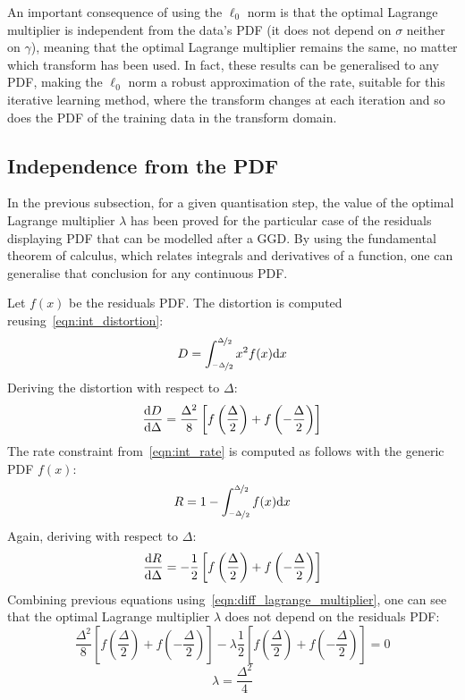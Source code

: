 \documentclass[11pt,a4paper,openright,twoside]{book}
\numberwithin{equation}{section} %
\numberwithin{figure}{section} %
\numberwithin{table}{section} %
\begin{document}
An important consequence of using the $\ell_0$ norm is that the optimal
Lagrange multiplier is independent from the data's \ac{PDF} (it does
not depend on $\sigma$ neither on $\gamma$), meaning that the optimal
Lagrange multiplier remains the same, no matter which transform has been
used.
In fact, these results can be generalised to any \ac{PDF}, making the
$\ell_0$ norm a robust approximation of the rate, suitable for this
iterative learning method, where the transform changes at each iteration
and so does the \ac{PDF} of the training data in the transform domain.

\subsection{Independence from the \acs{PDF}}
\label{sub:independence_from_the_pdf}

In the previous subsection, for a given quantisation step, the value of
the optimal Lagrange multiplier $\lambda$ has been proved for the
particular case of the residuals displaying \ac{PDF} that can be
modelled after a \ac{GGD}.
By using the fundamental theorem of calculus, which relates integrals
and derivatives of a function, one can generalise that conclusion for
any continuous \ac{PDF}.

Let $f(x)$ be the residuals \ac{PDF}.
The distortion is computed reusing~\eqref{eqn:int_distortion}:
\begin{equation}
	D = \int_{\nicefrac{-\Delta}{2}}^{\nicefrac{\Delta}{2}} x^2 f(x) \text{d} x
\end{equation}
Deriving the distortion with respect to $\Delta$:
\begin{equation}
	\frac{\text{d} D}{\text{d} \Delta} =
	\frac{\Delta^2}{8}\left[
	f\left(\frac{\Delta}{2}\right)+f\left(-\frac{\Delta}{2}\right)\right]
\end{equation}
The rate constraint from~\eqref{eqn:int_rate} is computed as
follows with the generic \ac{PDF}
$f(x)$:
\begin{equation}
	R = 1 - \int_{\nicefrac{-\Delta}{2}}^{\nicefrac{\Delta}{2}} f(x) \text{d} x\\
\end{equation}
Again, deriving with respect to $\Delta$:
\begin{equation}
	\frac{\text{d} R}{\text{d} \Delta} =
	-\frac{1}{2}\left[
	f\left(\frac{\Delta}{2}\right)+
	f\left(-\frac{\Delta}{2}\right)\right]
\end{equation}
Combining previous equations using~\eqref{eqn:diff_lagrange_multiplier},
one can see that the optimal Lagrange multiplier $\lambda$ does not
depend on the residuals \ac{PDF}:
\begin{equation}
	\frac{\Delta^2}{8}\left[
	f\left(\frac{\Delta}{2}\right)+f\left(-\frac{\Delta}{2}\right)\right]
	- \lambda
	\frac{1}{2}\left[
	f\left(\frac{\Delta}{2}\right)+
	f\left(-\frac{\Delta}{2}\right)\right] = 0
\end{equation}
\begin{equation}
	\boxed{\lambda = \frac{\Delta^2}{4}}
\end{equation}
\end{document}
